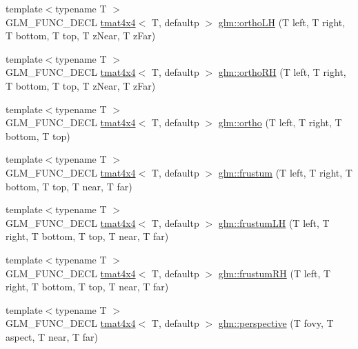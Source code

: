 \begin{DoxyCompactItemize}
{\footnotesize template$<$typename T $>$ }\\G\+L\+M\+\_\+\+F\+U\+N\+C\+\_\+\+D\+E\+CL \hyperlink{structglm_1_1tmat4x4}{tmat4x4}$<$ T, defaultp $>$ \hyperlink{group__gtc__matrix__transform_ga71503df1e691b12cc2d45e64fd0628fe}{glm\+::ortho\+LH} (T left, T right, T bottom, T top, T z\+Near, T z\+Far)
\item 
{\footnotesize template$<$typename T $>$ }\\G\+L\+M\+\_\+\+F\+U\+N\+C\+\_\+\+D\+E\+CL \hyperlink{structglm_1_1tmat4x4}{tmat4x4}$<$ T, defaultp $>$ \hyperlink{group__gtc__matrix__transform_gada0aaaee76f1fd3c272698c8eca735a1}{glm\+::ortho\+RH} (T left, T right, T bottom, T top, T z\+Near, T z\+Far)
\item 
{\footnotesize template$<$typename T $>$ }\\G\+L\+M\+\_\+\+F\+U\+N\+C\+\_\+\+D\+E\+CL \hyperlink{structglm_1_1tmat4x4}{tmat4x4}$<$ T, defaultp $>$ \hyperlink{group__gtc__matrix__transform_ga45b1b64f99255c07119b4f1aaed04dd7}{glm\+::ortho} (T left, T right, T bottom, T top)
\item 
{\footnotesize template$<$typename T $>$ }\\G\+L\+M\+\_\+\+F\+U\+N\+C\+\_\+\+D\+E\+CL \hyperlink{structglm_1_1tmat4x4}{tmat4x4}$<$ T, defaultp $>$ \hyperlink{group__gtc__matrix__transform_gada6deb989d4b553fe0f7e3279f3afae1}{glm\+::frustum} (T left, T right, T bottom, T top, T near, T far)
\item 
{\footnotesize template$<$typename T $>$ }\\G\+L\+M\+\_\+\+F\+U\+N\+C\+\_\+\+D\+E\+CL \hyperlink{structglm_1_1tmat4x4}{tmat4x4}$<$ T, defaultp $>$ \hyperlink{group__gtc__matrix__transform_ga75b1c1d0ee1f80c1e873605adeb1838c}{glm\+::frustum\+LH} (T left, T right, T bottom, T top, T near, T far)
\item 
{\footnotesize template$<$typename T $>$ }\\G\+L\+M\+\_\+\+F\+U\+N\+C\+\_\+\+D\+E\+CL \hyperlink{structglm_1_1tmat4x4}{tmat4x4}$<$ T, defaultp $>$ \hyperlink{group__gtc__matrix__transform_gad0e184273bdacbe769e5cd81069e48ed}{glm\+::frustum\+RH} (T left, T right, T bottom, T top, T near, T far)
\item 
{\footnotesize template$<$typename T $>$ }\\G\+L\+M\+\_\+\+F\+U\+N\+C\+\_\+\+D\+E\+CL \hyperlink{structglm_1_1tmat4x4}{tmat4x4}$<$ T, defaultp $>$ \hyperlink{group__gtc__matrix__transform_gac3613dcb6c6916465ad5b7ad5a786175}{glm\+::perspective} (T fovy, T aspect, T near, T far)
\item 

\end{DoxyCompactItemize}
